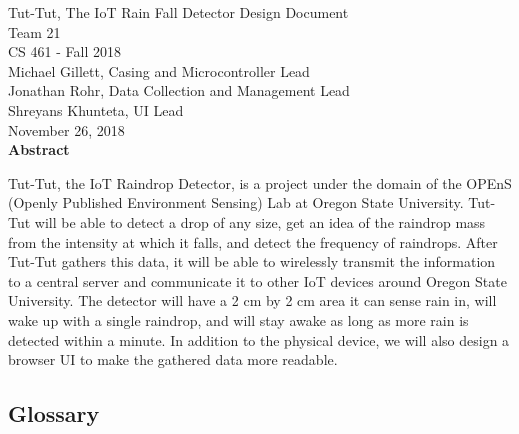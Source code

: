 \documentclass[letterpaper,10pt,draftclsnofoot,onecolumn]{article}
\begin{document}
\begin{titlepage}
\vspace*{\fill}
\begin{center}
{\Large Tut-Tut, The IoT Rain Fall Detector Design Document}
\\[0.3cm]

{\large Team 21}
\\[0.3cm]

{\large CS 461 - Fall 2018}
\\[0.3cm]

{\large Michael Gillett, Casing and Microcontroller Lead}
\\[0.3cm]
{\large Jonathan Rohr, Data Collection and Management Lead}
\\[0.3cm]
{\large Shreyans Khunteta, UI Lead}
\\[0.3cm]

{\large November 26, 2018}
\\[1cm]

{\Large \textbf{Abstract}}
\end{center}
Tut-Tut, the IoT Raindrop Detector, is a project under the domain of the OPEnS (Openly Published Environment Sensing) Lab at Oregon State University. Tut-Tut will be able to detect a drop of any size, get an idea of the raindrop mass from the intensity at which it falls, and detect the frequency of raindrops. After Tut-Tut gathers this data, it will be able to wirelessly transmit the information to a central server and communicate it to other IoT devices around Oregon State University. The detector will have a 2 cm by 2 cm area it can sense rain in, will wake up with a single raindrop, and will stay awake as long as more rain is detected within a minute. In addition to the physical device, we will also design a browser UI to make the gathered data more readable.
\vspace*{\fill}
\end{titlepage}

\begin{center}
\section*{Glossary}
\end{center}
\end{document}
